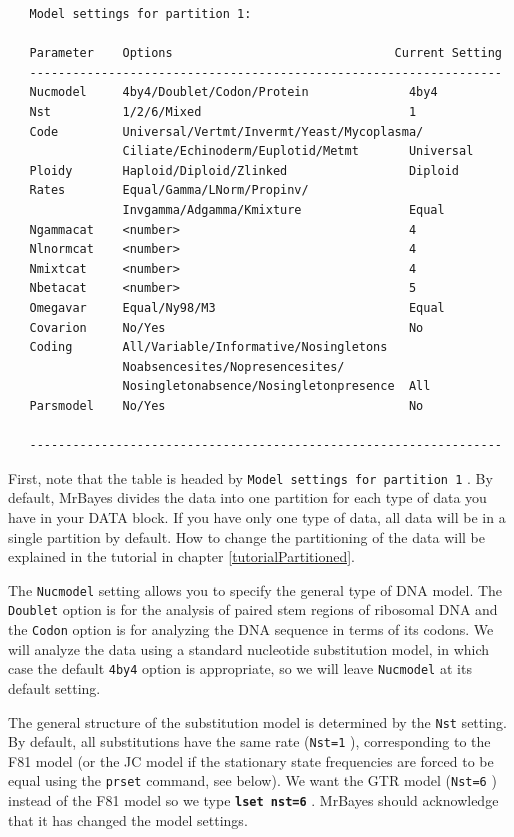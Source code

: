 \documentclass[12pt]{book}
\newcommand{\ttt}[1]{\texttt{#1} }
\newcommand{\tb}[1]{\ttt{\textbf{#1}} }
\begin{document}
\begin{singlespacing}
\small
\begin{verbatim}
   Model settings for partition 1:

   Parameter    Options                               Current Setting
   ------------------------------------------------------------------
   Nucmodel     4by4/Doublet/Codon/Protein              4by4
   Nst          1/2/6/Mixed                             1
   Code         Universal/Vertmt/Invermt/Yeast/Mycoplasma/
                Ciliate/Echinoderm/Euplotid/Metmt       Universal
   Ploidy       Haploid/Diploid/Zlinked                 Diploid
   Rates        Equal/Gamma/LNorm/Propinv/
                Invgamma/Adgamma/Kmixture               Equal
   Ngammacat    <number>                                4
   Nlnormcat    <number>                                4
   Nmixtcat     <number>                                4
   Nbetacat     <number>                                5
   Omegavar     Equal/Ny98/M3                           Equal
   Covarion     No/Yes                                  No
   Coding       All/Variable/Informative/Nosingletons
                Noabsencesites/Nopresencesites/
                Nosingletonabsence/Nosingletonpresence  All
   Parsmodel    No/Yes                                  No

   ------------------------------------------------------------------
\end{verbatim}
\normalsize
\end{singlespacing}

First, note that the table is headed by \ttt{Model settings for partition 1}. By default,
MrBayes divides the data into one partition for each type of data you have in your DATA block. If
you have only one type of data, all data will be in a single partition by default. How to change
the partitioning of the data will be explained in the tutorial in chapter
\ref{tutorialPartitioned}.

The \ttt{Nucmodel} setting allows you to specify the general type of DNA model. The
\ttt{Doublet} option is for the analysis of paired stem regions of ribosomal DNA and the
\ttt{Codon} option is for analyzing the DNA sequence in terms of its codons. We will analyze the
data using a standard nucleotide substitution model, in which case the default \ttt{4by4} option
is appropriate, so we will leave \ttt{Nucmodel} at its default setting.

The general structure of the substitution model is determined by the \ttt{Nst} setting. By
default, all substitutions have the same rate (\ttt{Nst=1}), corresponding to the F81 model (or
the JC model if the stationary state frequencies are forced to be equal using the \ttt{prset}
command, see below). We want the GTR model (\ttt{Nst=6}) instead of the F81 model so we type
\tb{lset nst=6}. MrBayes should acknowledge that it has changed the model settings.
\end{document}
